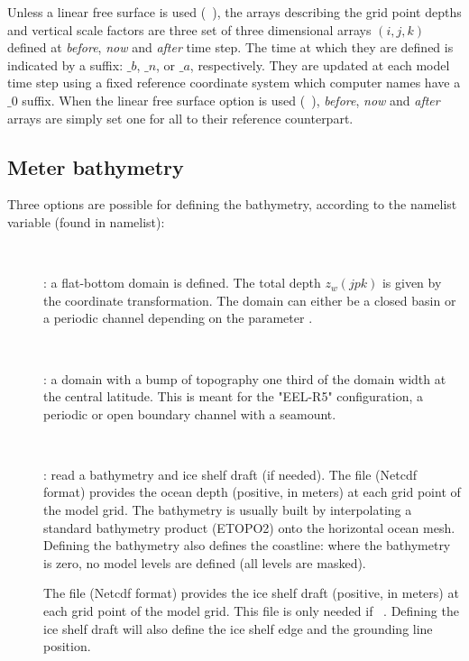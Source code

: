 \documentclass[../main/NEMO_manual]{subfiles}
\begin{document}
Unless a linear free surface is used (~),
the arrays describing the grid point depths and vertical scale factors are three set of
three dimensional arrays $(i,j,k)$ defined at \textit{before}, \textit{now} and \textit{after} time step.
The time at which they are defined is indicated by a suffix: $\_b$, $\_n$, or $\_a$, respectively.
They are updated at each model time step using a fixed reference coordinate system which
computer names have a $\_0$ suffix.
When the linear free surface option is used (~), \textit{before},
\textit{now} and \textit{after} arrays are simply set one for all to their reference counterpart.

\subsection{Meter bathymetry}
\label{subsec:DOM_bathy}

Three options are possible for defining the bathymetry, according to the namelist variable 
(found in  namelist): 
\begin{description}
\item[~]:
  a flat-bottom domain is defined.
  The total depth $z_w (jpk)$ is given by the coordinate transformation.
  The domain can either be a closed basin or a periodic channel depending on the parameter .
\item[~]:
  a domain with a bump of topography one third of the domain width at the central latitude.
  This is meant for the "EEL-R5" configuration, a periodic or open boundary channel with a seamount.
\item[~]:
  read a bathymetry and ice shelf draft (if needed).
  The  file (Netcdf format) provides the ocean depth (positive, in meters) at
  each grid point of the model grid.
  The bathymetry is usually built by interpolating a standard bathymetry product (\eg ETOPO2) onto
  the horizontal ocean mesh.
  Defining the bathymetry also defines the coastline: where the bathymetry is zero,
  no model levels are defined (all levels are masked).

  The  file (Netcdf format) provides the ice shelf draft (positive, in meters) at
  each grid point of the model grid.
  This file is only needed if ~.
  Defining the ice shelf draft will also define the ice shelf edge and the grounding line position.
\end{description}
\end{document}
